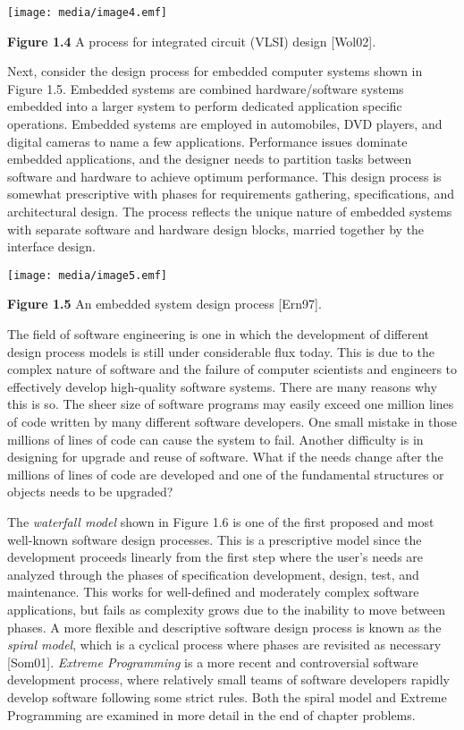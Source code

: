 \texttt{[image: media/image4.emf]}

\textbf{Figure 1.4} A process for integrated circuit (VLSI) design
{[}Wol02{]}.

Next, consider the design process for embedded computer systems shown in
Figure 1.5. Embedded systems are combined hardware/software systems
embedded into a larger system to perform dedicated application specific
operations. Embedded systems are employed in automobiles, DVD players,
and digital cameras to name a few applications. Performance issues
dominate embedded applications, and the designer needs to partition
tasks between software and hardware to achieve optimum performance. This
design process is somewhat prescriptive with phases for requirements
gathering, specifications, and architectural design. The process
reflects the unique nature of embedded systems with separate software
and hardware design blocks, married together by the interface design.

\texttt{[image: media/image5.emf]}

\textbf{Figure 1.5} An embedded system design process {[}Ern97{]}.

The field of software engineering is one in which the development of
different design process models is still under considerable flux today.
This is due to the complex nature of software and the failure of
computer scientists and engineers to effectively develop high-quality
software systems. There are many reasons why this is so. The sheer size
of software programs may easily exceed one million lines of code written
by many different software developers. One small mistake in those
millions of lines of code can cause the system to fail. Another
difficulty is in designing for upgrade and reuse of software. What if
the needs change after the millions of lines of code are developed and
one of the fundamental structures or objects needs to be upgraded?

The \emph{waterfall model} shown in Figure 1.6 is one of the first
proposed and most well-known software design processes. This is a
prescriptive model since the development proceeds linearly from the
first step where the user's needs are analyzed through the phases of
specification development, design, test, and maintenance. This works for
well-defined and moderately complex software applications, but fails as
complexity grows due to the inability to move between phases. A more
flexible and descriptive software design process is known as the
\emph{spiral model}, which is a cyclical process where phases are
revisited as necessary {[}Som01{]}. \emph{Extreme Programming} is a more
recent and controversial software development process, where relatively
small teams of software developers rapidly develop software following
some strict rules. Both the spiral model and Extreme Programming are
examined in more detail in the end of chapter problems.

